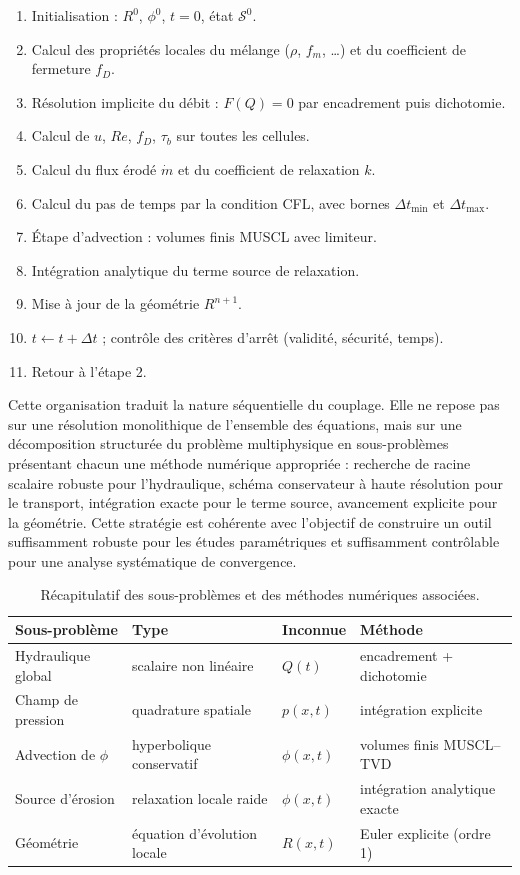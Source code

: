 \documentclass[11pt,a4paper]{report}
\newcommand{\mdot}{\dot{m}}
\newcommand{\dt}{\Delta t}
\begin{document}
\begin{enumerate}[label=\arabic*.]
  \item Initialisation : \(R^0\), \(\phi^0\), \(t=0\), état \(\mathcal{S}^0\).
  \item Calcul des propriétés locales du mélange (\(\rho\), \(f_m\), \dots) et du coefficient de
        fermeture \(f_D\).
  \item Résolution implicite du débit : \(F(Q)=0\) par encadrement puis dichotomie.
  \item Calcul de \(u\), \(Re\), \(f_D\), \(\tau_b\) sur toutes les cellules.
  \item Calcul du flux érodé \(\mdot\) et du coefficient de relaxation \(k\).
  \item Calcul du pas de temps par la condition CFL, avec bornes \(\dt_{\min}\) et \(\dt_{\max}\).
  \item Étape d'advection : volumes finis MUSCL avec limiteur.
  \item Intégration analytique du terme source de relaxation.
  \item Mise à jour de la géométrie \(R^{n+1}\).
  \item \(t \leftarrow t+\dt\) ; contrôle des critères d'arrêt (validité, sécurité, temps).
  \item Retour à l'étape 2.
\end{enumerate}

Cette organisation traduit la nature séquentielle du couplage. Elle ne repose pas sur une résolution
monolithique de l'ensemble des équations, mais sur une décomposition structurée du problème multiphysique
en sous-problèmes présentant chacun une méthode numérique appropriée : recherche de racine scalaire robuste
pour l'hydraulique, schéma conservateur à haute résolution pour le transport, intégration exacte pour le
terme source, avancement explicite pour la géométrie. Cette stratégie est cohérente avec l'objectif de
construire un outil suffisamment robuste pour les études paramétriques et suffisamment contrôlable pour une
analyse systématique de convergence.

\begin{table}[H]
\centering
\caption{Récapitulatif des sous-problèmes et des méthodes numériques associées.}
\label{tab:methodes}
\small
\begin{tabular}{llll}
\toprule
Sous-problème & Type & Inconnue & Méthode \\
\midrule
Hydraulique global & scalaire non linéaire & \(Q(t)\) & encadrement + dichotomie \\
Champ de pression & quadrature spatiale & \(p(x,t)\) & intégration explicite \\
Advection de \(\phi\) & hyperbolique conservatif & \(\phi(x,t)\) & volumes finis MUSCL--TVD \\
Source d'érosion & relaxation locale raide & \(\phi(x,t)\) & intégration analytique exacte \\
Géométrie & équation d'évolution locale & \(R(x,t)\) & Euler explicite (ordre 1) \\
\bottomrule
\end{tabular}
\end{table}
\end{document}
